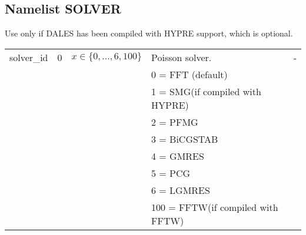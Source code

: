 \documentclass[twoside,11pt,fleqn,a4paper,english,openright]{report}
\begin{document}
\subsection{Namelist SOLVER}\label{par:solver}

Use only if DALES has been compiled with HYPRE support, which is optional.
\begin{center}
  \tablelasttail{
        &&&&\\\hline
  }
\begin{supertabular}{|l|p{2cm}|p{4cm}|p{6cm}|l|}
  solver\_id    & 0        &  $x\in\{ 0,...,6, 100 \}$    & Poisson solver. & -\\
        & & & 0 = FFT (default) & \\
  	& & & 1 = SMG(if compiled with HYPRE) & \\
  	& & & 2 = PFMG  & \\
  	& & & 3 = BiCGSTAB & \\
        & & & 4 = GMRES & \\
        & & & 5 = PCG & \\
        & & & 6 = LGMRES & \\
      	& & & 100 = FFTW(if compiled with FFTW) & \\


\end{supertabular}
\end{center}
\end{document}
